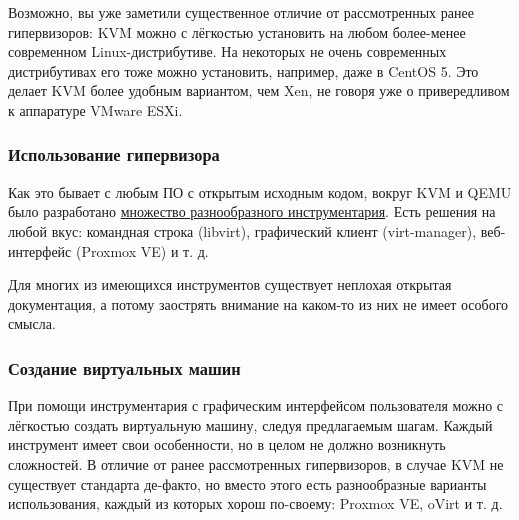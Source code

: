 \documentclass[14pt, a4paper]{article}
\begin{document}
Возможно, вы уже заметили существенное отличие от рассмотренных ранее гипервизоров: KVM
можно с лёгкостью установить на любом более-менее современном Linux-дистрибутиве. На
некоторых не очень современных дистрибутивах его тоже можно установить, например, даже в
CentOS 5. Это делает KVM более удобным вариантом, чем Xen, не говоря уже о привередливом к
аппаратуре VMware ESXi.

\subsubsection*{Использование гипервизора}

Как это бывает с любым ПО с открытым исходным кодом, вокруг KVM и QEMU было разработано
\href{http://www.linux-kvm.org/page/Management_Tools}{множество разнообразного инструментария}. Есть решения на любой вкус: командная строка (libvirt),
графический клиент (virt-manager), веб-интерфейс (Proxmox VE) и т. д.

Для многих из имеющихся инструментов существует неплохая открытая документация, а потому
заострять внимание на каком-то из них не имеет особого смысла.

\begin{figure}[h]%
    \centering
    \label{3.1}
\end{figure}

\subsubsection*{Создание виртуальных машин}

При помощи инструментария с графическим интерфейсом пользователя можно с лёгкостью создать
виртуальную машину, следуя предлагаемым шагам. Каждый инструмент имеет свои особенности, но в
целом не должно возникнуть сложностей. В отличие от ранее рассмотренных гипервизоров, в случае
KVM не существует стандарта де-факто, но вместо этого есть разнообразные варианты
использования, каждый из которых хорош по-своему: Proxmox VE, oVirt и т. д.
\end{document}
